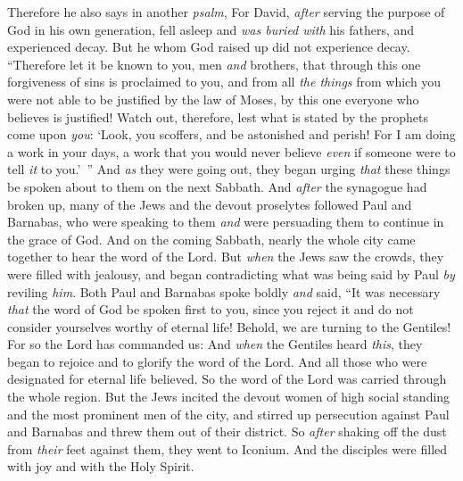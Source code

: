 \begin{biblechapter}
\verse Therefore he also says in another \textit{psalm},
\verse For David, \textit{after} serving the purpose of God in his own generation, fell asleep and \textit{was buried with} his fathers, and experienced decay.
\verse But he whom God raised up did not experience decay.
\verse “Therefore let it be known to you, men \textit{and} brothers, that through this one forgiveness of sins is proclaimed to you, and from all \textit{the things} from which you were not able to be justified by the law of Moses,
\verse by this one everyone who believes is justified!
\verse Watch out, therefore, lest what is stated by the prophets come upon \textit{you}:
\verse ‘Look, you scoffers, 
and be astonished and perish! 
For I am doing a work in your days, 
a work that you would never believe 
\textit{even} if someone were to tell \textit{it} to you.’ ”
 And \textit{as} they were going out, they began urging \textit{that} these things be spoken about to them on the next Sabbath.
\verse And \textit{after} the synagogue had broken up, many of the Jews and the devout proselytes followed Paul and Barnabas, who were speaking to them \textit{and} were persuading them to continue in the grace of God.
\verse And on the coming Sabbath, nearly the whole city came together to hear the word of the Lord.
\verse But \textit{when} the Jews saw the crowds, they were filled with jealousy, and began contradicting what was being said by Paul \textit{by} reviling \textit{him}.
\verse Both Paul and Barnabas spoke boldly \textit{and} said, “It was necessary \textit{that} the word of God be spoken first to you, since you reject it and do not consider yourselves worthy of eternal life! Behold, we are turning to the Gentiles!
\verse For so the Lord has commanded us:
\verse And \textit{when} the Gentiles heard \textit{this}, they began to rejoice and to glorify the word of the Lord. And all those who were designated for eternal life believed.
\verse So the word of the Lord was carried through the whole region.
\verse But the Jews incited the devout women of high social standing and the most prominent men of the city, and stirred up persecution against Paul and Barnabas and threw them out of their district.
\verse So \textit{after} shaking off the dust from \textit{their} feet against them, they went to Iconium.
\verse And the disciples were filled with joy and with the Holy Spirit.
\end{biblechapter}

